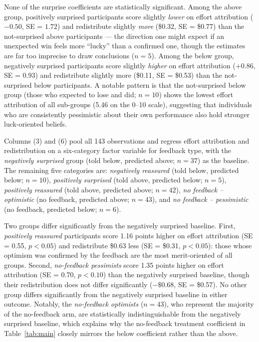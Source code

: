 \documentclass[12pt]{article}
\begin{document}
None of the surprise coefficients are statistically significant.
Among the above group, positively surprised participants score
slightly \emph{lower} on effort attribution ($-0.50$, SE = $1.72$)
and redistribute slightly \emph{more} (\$0.32, SE = \$0.77) than the
not-surprised above participants --- the direction one might expect
if an unexpected win feels more ``lucky'' than a confirmed one, though
the estimates are far too imprecise to draw conclusions ($n = 5$).
Among the below group, negatively surprised participants score
slightly \emph{higher} on effort attribution ($+0.86$, SE = $0.93$)
and redistribute slightly more (\$0.11, SE = \$0.53) than the
not-surprised below participants.
A notable pattern is that the not-surprised below group (those who
expected to lose and did; $n = 10$) shows the lowest effort attribution
of all sub-groups (5.46 on the 0--10 scale), suggesting that
individuals who are consistently pessimistic about their own performance
also hold stronger luck-oriented beliefs.

Columns (3) and (6) pool all 143 observations and regress effort attribution
and redistribution on a six-category factor variable for feedback type,
with the \emph{negatively surprised} group (told below, predicted above;
$n = 37$) as the baseline.
The remaining five categories are: \emph{negatively reassured} (told below,
predicted below; $n = 10$), \emph{positively surprised} (told above,
predicted below; $n = 5$), \emph{positively reassured} (told above,
predicted above; $n = 42$), \emph{no feedback -- optimistic} (no feedback,
predicted above; $n = 43$), and \emph{no feedback -- pessimistic} (no
feedback, predicted below; $n = 6$).

Two groups differ significantly from the negatively surprised baseline.
First, \emph{positively reassured} participants score 1.16 points higher on
effort attribution (SE = 0.55, $p < 0.05$) and redistribute \$0.63 less
(SE = \$0.31, $p < 0.05$): those whose optimism was confirmed by the
feedback are the most merit-oriented of all groups.
Second, \emph{no-feedback pessimists} score 1.35 points higher on effort
attribution (SE = 0.70, $p < 0.10$) than the negatively surprised baseline,
though their redistribution does not differ significantly ($-\$0.68$,
SE = \$0.57).
No other group differs significantly from the negatively surprised baseline
in either outcome.
Notably, the \emph{no-feedback optimists} ($n = 43$), who represent the
majority of the no-feedback arm, are statistically indistinguishable from
the negatively surprised baseline, which explains why the no-feedback
treatment coefficient in Table~\ref{tab:main} closely mirrors the below
coefficient rather than the above.
\end{document}
